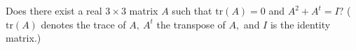 Does there exist a real \(3\times 3\) matrix \(A\) such that \(\text{tr}(A)=0\) and \(A^2+A^t=I?\) (\(\text{tr}(A)\) denotes the trace of \(A,\ A^t\) the transpose of \(A,\) and \(I\) is the identity matrix.)

